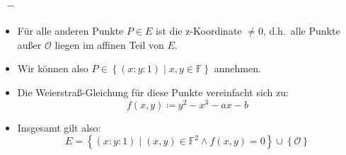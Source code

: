 \documentclass{beamer}
\theoremstyle{plain}
\theoremstyle{definition}
\theoremstyle{rem}
\newcommand{\patinf}{\mathcal{O}}
\begin{document}
\begin{frame}
\frametitle{\insertsection~--~\insertsubsection}
\begin{itemize}[<+->]
	\item Für alle anderen Punkte $P\in E$ ist die z-Koordinate $\ne 0$, d.h.\ alle Punkte außer $\patinf$ liegen im affinen Teil von $E$. 
	\item Wir können also $P \in \left\{(x:y:1) \mid x,y \in \mathbb{F} \right\}$ annehmen.
	\item Die Weierstraß-Gleichung für diese Punkte vereinfacht sich zu:
	\begin{equation*}
    		f(x,y) \coloneqq y^2 - x^3 - ax - b
	\end{equation*}
	\item Insgesamt gilt also:
		\begin{equation*}
		E = \left\{(x:y:1) \mid (x,y) \in \mathbb{F}^2 \land f(x,y) = 0 \right\} \cup \left\{ \patinf \right\}
		\end{equation*}
\end{itemize}
\end{frame}

\end{document}

